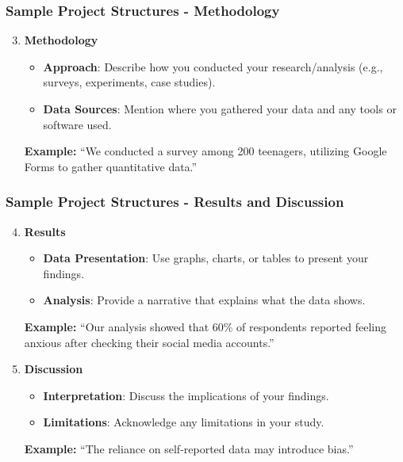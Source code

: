 \documentclass[aspectratio=169]{beamer}
\begin{document}
\begin{frame}[fragile]
    \frametitle{Sample Project Structures - Methodology}
    \begin{enumerate}
        \setcounter{enumi}{2} %
        \item \textbf{Methodology}
        \begin{itemize}
            \item \textbf{Approach}: Describe how you conducted your research/analysis (e.g., surveys, experiments, case studies).
            \item \textbf{Data Sources}: Mention where you gathered your data and any tools or software used.
        \end{itemize}
        \textbf{Example:} “We conducted a survey among 200 teenagers, utilizing Google Forms to gather quantitative data.”
    \end{enumerate}
\end{frame}

\begin{frame}[fragile]
    \frametitle{Sample Project Structures - Results and Discussion}
    \begin{enumerate}
        \setcounter{enumi}{3} %
        \item \textbf{Results}
        \begin{itemize}
            \item \textbf{Data Presentation}: Use graphs, charts, or tables to present your findings.
            \item \textbf{Analysis}: Provide a narrative that explains what the data shows.
        \end{itemize}
        \textbf{Example:} “Our analysis showed that 60\% of respondents reported feeling anxious after checking their social media accounts.”
        
        \item \textbf{Discussion}
        \begin{itemize}
            \item \textbf{Interpretation}: Discuss the implications of your findings.
            \item \textbf{Limitations}: Acknowledge any limitations in your study.
        \end{itemize}
        \textbf{Example:} “The reliance on self-reported data may introduce bias.”
    \end{enumerate}
\end{frame}
\end{document}
